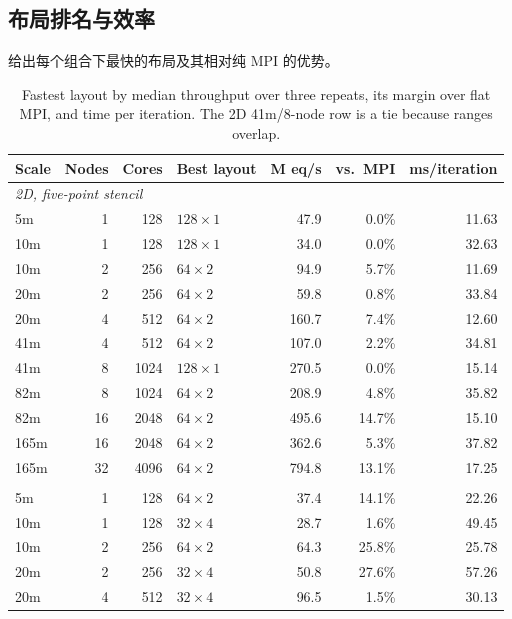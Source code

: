 \documentclass[11pt,a4paper,oneside]{report}
\let\OldSubsection\subsection
\renewcommand{\subsection}{\FloatBarrier\OldSubsection}
\begin{document}
\subsection{布局排名与效率}
\label{sec:weak-ranking}
 给出每个组合下最快的布局及其相对纯 MPI 的优势。

\begin{table}[htbp]
  \centering
  \caption{Fastest layout by median throughput over three repeats, its margin over flat
  MPI, and time per iteration. The 2D 41m/8-node row is a tie because ranges overlap.}
  \label{tab:weak-best}
  \small
  \begin{tabular}{lrrlrrr}
    \toprule
    Scale & Nodes & Cores & Best layout & M eq/s & vs.\ MPI & ms/iteration \\
    \midrule
    \multicolumn{7}{l}{\emph{2D, five-point stencil}} \\
    5m   &  1 &  128 & $128\times1$ &  47.9 &  0.0\% & 11.63 \\
    10m  &  1 &  128 & $128\times1$ &  34.0 &  0.0\% & 32.63 \\
    10m  &  2 &  256 & $64\times2$  &  94.9 &  5.7\% & 11.69 \\
    20m  &  2 &  256 & $64\times2$  &  59.8 &  0.8\% & 33.84 \\
    20m  &  4 &  512 & $64\times2$  & 160.7 &  7.4\% & 12.60 \\
    41m  &  4 &  512 & $64\times2$  & 107.0 &  2.2\% & 34.81 \\
    41m  &  8 & 1024 & $128\times1$ & 270.5 &  0.0\% & 15.14 \\
    82m  &  8 & 1024 & $64\times2$  & 208.9 &  4.8\% & 35.82 \\
    82m  & 16 & 2048 & $64\times2$  & 495.6 & 14.7\% & 15.10 \\
    165m & 16 & 2048 & $64\times2$  & 362.6 &  5.3\% & 37.82 \\
    165m & 32 & 4096 & $64\times2$  & 794.8 & 13.1\% & 17.25 \\
    \addlinespace
    \multicolumn{7}{l}{\emph{3D, seven-point stencil}} \\
    5m   &  1 &  128 & $64\times2$  &  37.4 & 14.1\% & 22.26 \\
    10m  &  1 &  128 & $32\times4$  &  28.7 &  1.6\% & 49.45 \\
    10m  &  2 &  256 & $64\times2$  &  64.3 & 25.8\% & 25.78 \\
    20m  &  2 &  256 & $32\times4$  &  50.8 & 27.6\% & 57.26 \\
    20m  &  4 &  512 & $32\times4$  &  96.5 &  1.5\% & 30.13 \\

\end{tabular}
\end{table}
\end{document}
